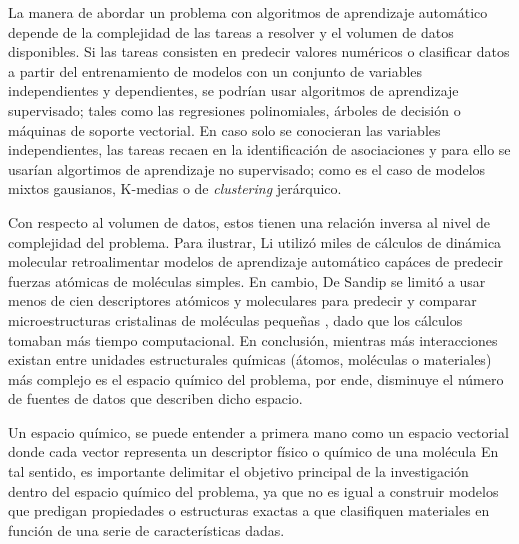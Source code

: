 La manera de abordar un problema con algoritmos de aprendizaje automático depende de la complejidad de las tareas a resolver y el volumen de datos disponibles. Si las tareas consisten en predecir valores numéricos o clasificar datos a partir del entrenamiento de modelos con un conjunto de variables independientes y dependientes, se podrían usar algoritmos de aprendizaje supervisado; tales como las regresiones polinomiales, árboles de decisión o máquinas de soporte vectorial. En caso solo se conocieran las variables independientes, las tareas recaen en la identificación de asociaciones y para ello se usarían algortimos de aprendizaje no supervisado; como es el caso de modelos mixtos gausianos, K-medias o de \textit{clustering} jerárquico. 

Con respecto al volumen de datos, estos tienen una relación inversa al nivel de complejidad del problema. Para ilustrar, Li utilizó miles de cálculos de dinámica molecular retroalimentar modelos de aprendizaje automático capáces de predecir fuerzas atómicas \cite{li2015molecular} de moléculas simples. En cambio, De Sandip se limitó a usar menos de cien descriptores atómicos y moleculares para predecir y comparar microestructuras cristalinas de moléculas pequeñas \cite{de2016comparing}, dado que los cálculos tomaban más tiempo computacional. En conclusión, mientras más interacciones existan entre unidades estructurales químicas (átomos, moléculas o materiales) más complejo es el espacio químico del problema, por ende, disminuye el número de fuentes de datos que describen dicho espacio. 

Un espacio químico, se puede entender a primera mano como un espacio vectorial donde cada vector representa un descriptor físico o químico de una molécula En tal sentido, es importante delimitar el objetivo principal de la investigación dentro del espacio químico del problema, ya que no es igual a construir modelos que predigan propiedades o estructuras exactas a que clasifiquen materiales en función de una serie de características dadas. 

